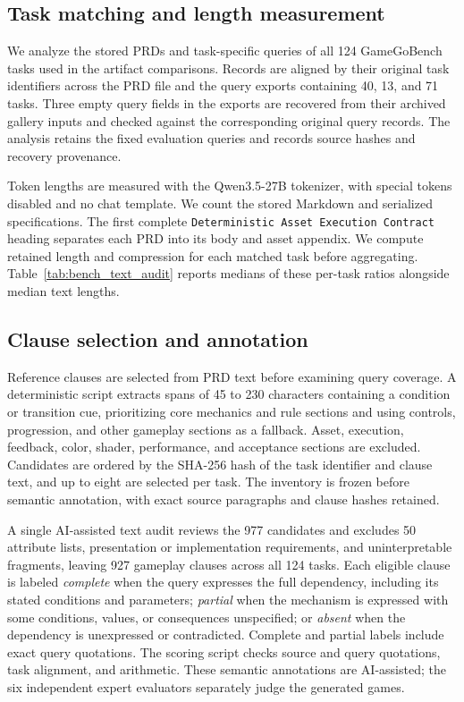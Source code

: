 \documentclass{article}
\begin{document}
\subsection{Task matching and length measurement}

We analyze the stored PRDs and task-specific queries of all 124 GameGoBench tasks used in the artifact comparisons. Records are aligned by their original task identifiers across the PRD file and the query exports containing 40, 13, and 71 tasks. Three empty query fields in the exports are recovered from their archived gallery inputs and checked against the corresponding original query records. The analysis retains the fixed evaluation queries and records source hashes and recovery provenance.

Token lengths are measured with the Qwen3.5-27B tokenizer, with special tokens disabled and no chat template. We count the stored Markdown and serialized specifications. The first complete \texttt{Deterministic Asset Execution Contract} heading separates each PRD into its body and asset appendix. We compute retained length and compression for each matched task before aggregating. Table~\ref{tab:bench_text_audit} reports medians of these per-task ratios alongside median text lengths.

\subsection{Clause selection and annotation}

Reference clauses are selected from PRD text before examining query coverage. A deterministic script extracts spans of 45 to 230 characters containing a condition or transition cue, prioritizing core mechanics and rule sections and using controls, progression, and other gameplay sections as a fallback. Asset, execution, feedback, color, shader, performance, and acceptance sections are excluded. Candidates are ordered by the SHA-256 hash of the task identifier and clause text, and up to eight are selected per task. The inventory is frozen before semantic annotation, with exact source paragraphs and clause hashes retained.

A single AI-assisted text audit reviews the 977 candidates and excludes 50 attribute lists, presentation or implementation requirements, and uninterpretable fragments, leaving 927 gameplay clauses across all 124 tasks. Each eligible clause is labeled \emph{complete} when the query expresses the full dependency, including its stated conditions and parameters; \emph{partial} when the mechanism is expressed with some conditions, values, or consequences unspecified; or \emph{absent} when the dependency is unexpressed or contradicted. Complete and partial labels include exact query quotations. The scoring script checks source and query quotations, task alignment, and arithmetic. These semantic annotations are AI-assisted; the six independent expert evaluators separately judge the generated games.
\end{document}

